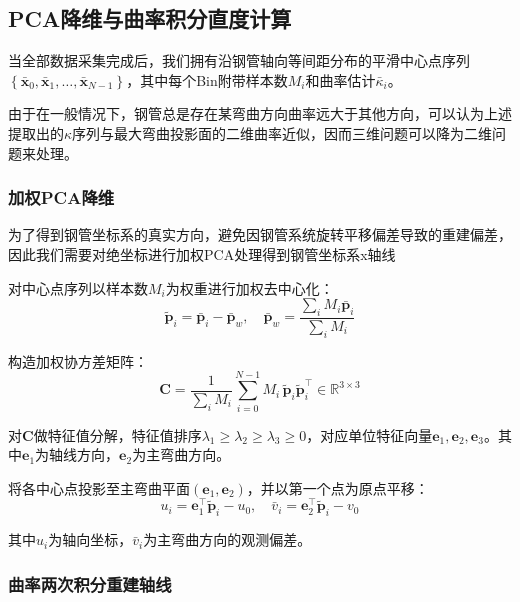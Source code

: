 \documentclass{article}
\let\oldcite\cite
\renewcommand{\cite}[1]{\oldcite{#1}}
\begin{document}
\subsection{PCA降维与曲率积分直度计算}

当全部数据采集完成后，我们拥有沿钢管轴向等间距分布的平滑中心点序列$\left\{ \bar{\mathbf{x}}_0, \bar{\mathbf{x}}_1, \dots, \bar{\mathbf{x}}_{N-1} \right\}$，其中每个Bin附带样本数$M_i$和曲率估计$\bar{\kappa}_i$。

由于在一般情况下，钢管总是存在某弯曲方向曲率远大于其他方向，可以认为上述提取出的$\kappa$序列与最大弯曲投影面的二维曲率近似，因而三维问题可以降为二维问题来处理。

\subsubsection{加权PCA降维}

为了得到钢管坐标系的真实方向，避免因钢管系统旋转平移偏差导致的重建偏差，因此我们需要对绝坐标进行加权PCA\cite{wpca}处理得到钢管坐标系x轴线

对中心点序列以样本数$M_i$为权重进行加权去中心化：
\begin{equation}
    \tilde{\mathbf{p}}_i = \bar{\mathbf{p}}_i - \bar{\mathbf{p}}_w, \quad \bar{\mathbf{p}}_w = \frac{\sum_i M_i \bar{\mathbf{p}}_i}{\sum_i M_i}
\end{equation}

构造加权协方差矩阵：
\begin{equation}
    \mathbf{C} = \frac{1}{\sum_i M_i} \sum_{i=0}^{N-1} M_i\, \tilde{\mathbf{p}}_i \tilde{\mathbf{p}}_i^\top \in \mathbb{R}^{3\times 3}
\end{equation}

对$\mathbf{C}$做特征值分解，特征值排序$\lambda_1 \ge \lambda_2 \ge \lambda_3 \ge 0$，对应单位特征向量$\mathbf{e}_1, \mathbf{e}_2, \mathbf{e}_3$。其中$\mathbf{e}_1$为轴线方向，$\mathbf{e}_2$为主弯曲方向。

将各中心点投影至主弯曲平面$(\mathbf{e}_1, \mathbf{e}_2)$，并以第一个点为原点平移：
\begin{equation}
    u_i = \mathbf{e}_1^\top \tilde{\mathbf{p}}_i - u_0, \quad \bar{v}_i = \mathbf{e}_2^\top \tilde{\mathbf{p}}_i - v_0
\end{equation}

其中$u_i$为轴向坐标，$\bar{v}_i$为主弯曲方向的观测偏差。

\subsubsection{曲率两次积分重建轴线}
\end{document}
